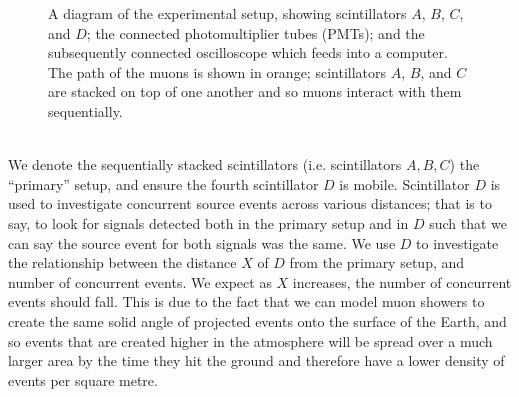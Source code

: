 \documentclass[a4paper]{article}
\begin{document}
\begin{figure}[h!]
\begin{center}
\end{center}
\caption{A diagram of the experimental setup, showing scintillators $A$, $B$, $C$, and $D$; the connected photomultiplier tubes (PMTs); and the subsequently connected oscilloscope which feeds into a computer. The path of the muons is shown in orange; scintillators $A$, $B$, and $C$ are stacked on top of one another and so muons interact with them sequentially.}
\end{figure}
\\ \noindent
We denote the sequentially stacked scintillators (i.e. scintillators $A,B,C$) the ``primary'' setup, and ensure the fourth scintillator $D$ is mobile.
Scintillator $D$ is used to investigate concurrent source events across various distances; that is to say, to look for signals detected both in the primary setup and in $D$ such that we can say the source event for both signals was the same.
We use $D$ to investigate the relationship between the distance $X$ of $D$ from the primary setup, and number of concurrent events. We expect as $X$ increases, the number of concurrent events should fall.
This is due to the fact that we can model muon showers to create the same solid angle of projected events onto the surface of the Earth, and so events that are created higher in the atmosphere will be spread over a much larger area by the time they hit the ground and therefore have a lower density of events per square metre. 
\end{document}
